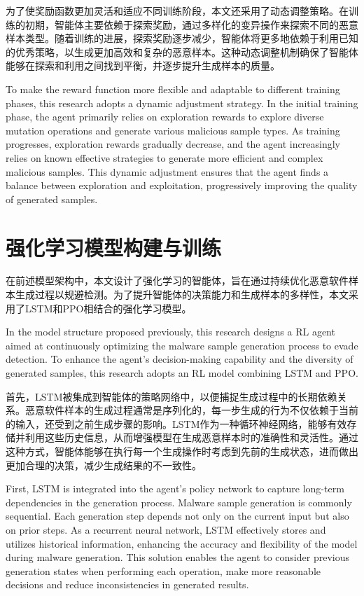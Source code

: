 为了使奖励函数更加灵活和适应不同训练阶段，本文还采用了动态调整策略。在训练的初期，智能体主要依赖于探索奖励，通过多样化的变异操作来探索不同的恶意样本类型。随着训练的进展，探索奖励逐步减少，智能体将更多地依赖于利用已知的优秀策略，以生成更加高效和复杂的恶意样本。这种动态调整机制确保了智能体能够在探索和利用之间找到平衡，并逐步提升生成样本的质量。

To make the reward function more flexible and adaptable to different training phases, this research adopts a dynamic adjustment strategy. In the initial training phase, the agent primarily relies on exploration rewards to explore diverse mutation operations and generate various malicious sample types. As training progresses, exploration rewards gradually decrease, and the agent increasingly relies on known effective strategies to generate more efficient and complex malicious samples. This dynamic adjustment ensures that the agent finds a balance between exploration and exploitation, progressively improving the quality of generated samples.

\section{强化学习模型构建与训练}


在前述模型架构中，本文设计了强化学习的智能体，旨在通过持续优化恶意软件样本生成过程以规避检测。为了提升智能体的决策能力和生成样本的多样性，本文采用了LSTM和PPO相结合的强化学习模型。

In the model structure proposed previously, this research designs a RL agent aimed at continuously optimizing the malware sample generation process to evade detection. To enhance the agent's decision-making capability and the diversity of generated samples, this research adopts an RL model combining LSTM and PPO.

首先，LSTM被集成到智能体的策略网络中，以便捕捉生成过程中的长期依赖关系。恶意软件样本的生成过程通常是序列化的，每一步生成的行为不仅依赖于当前的输入，还受到之前生成步骤的影响。LSTM作为一种循环神经网络，能够有效存储并利用这些历史信息，从而增强模型在生成恶意样本时的准确性和灵活性。通过这种方式，智能体能够在执行每一个生成操作时考虑到先前的生成状态，进而做出更加合理的决策，减少生成结果的不一致性。

First, LSTM is integrated into the agent's policy network to capture long-term dependencies in the generation process. Malware sample generation is commonly sequential. Each generation step depends not only on the current input but also on prior steps. As a recurrent neural network, LSTM effectively stores and utilizes historical information, enhancing the accuracy and flexibility of the model during malware generation. This solution enables the agent to consider previous generation states when performing each operation, make more reasonable decisions and reduce inconsistencies in generated results.

